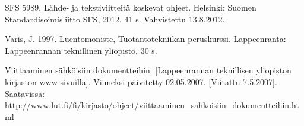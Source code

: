 \documentclass{LUT_pohja}[2016/03/09 LUT Dippa Pohja]
\begin{document}
\begin{thebibliography}{99}
SFS 5989. Lähde- ja tekstiviitteitä koskevat ohjeet. Helsinki: Suomen Standardisoimisliitto 
SFS, 2012. 41 s. Vahvistettu 13.8.2012. 

Varis, J. 1997. Luentomoniste, Tuotantotekniikan peruskurssi. Lappeenranta: Lappeenrannan teknillinen yliopisto. 30 s. 

Viittaaminen sähköisiin dokumentteihin. [Lappeenrannan teknillisen yliopiston kirjaston 
www-sivuilla].  Viimeksi  päivitetty  02.05.2007.  [Viitattu  7.5.2007].  Saatavissa:
\url{http://www.lut.fi/fi/kirjasto/ohjeet/viittaaminen_sahkoisiin_dokumentteihin.html}

\end{thebibliography}
\newpage
\end{document}
